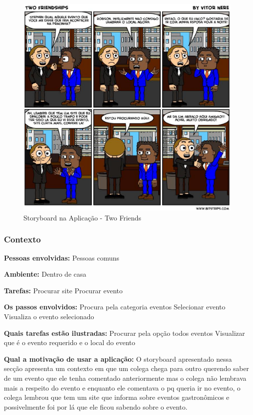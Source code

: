 \begin{figure}[H]
	\begin{center}
		\includegraphics[keepaspectratio,scale=0.6]{figuras/bitstrip.eps}
		\caption{Storyboard na Aplicação - Two Friends}
	\end{center}
\end{figure}

\subsubsection{Contexto}

\textbf{Pessoas envolvidas:} 
	Pessoas comuns

\textbf{Ambiente:}
	Dentro de casa

\textbf{Tarefas:}
	Procurar site
	Procurar evento

\textbf{Os passos envolvidos:}
	Procura pela categoria eventos
	Selecionar evento
	Visualiza o evento selecionado

\textbf{Quais tarefas estão ilustradas:}
	Procurar pela opção todos eventos
	Visualizar que é o evento requerido e o local do evento

\textbf{Qual a motivação de usar a aplicação:}
	O storyboard apresentado nessa secção apresenta um contexto em que um colega chega para outro querendo saber de um evento que ele tenha comentado anteriormente mas o colega não lembrava mais a respeito do evento e enquanto ele comentava o pq queria ir no evento, o colega lembrou que tem um site que informa sobre eventos gastronômicos e possivelmente foi por lá que ele ficou sabendo sobre o evento.